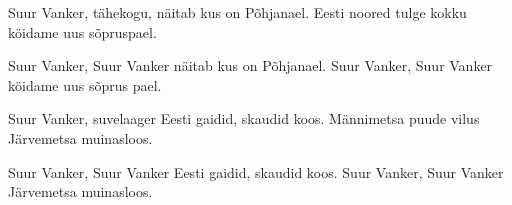 Suur Vanker, t\"ahekogu,
n\"aitab kus on P\~ohjanael.
Eesti noored tulge kokku
k\"oidame uus s\~opruspael.

Suur Vanker, Suur Vanker
n\"aitab kus on P\~ohjanael.
Suur Vanker, Suur Vanker
k\"oidame uus s\~oprus pael.

Suur Vanker, suvelaager
Eesti gaidid, skaudid koos. 
M\"annimetsa puude vilus
J\"arvemetsa muinasloos.

Suur Vanker, Suur Vanker
Eesti gaidid, skaudid koos.
Suur Vanker, Suur Vanker
J\"arvemetsa muinasloos.
